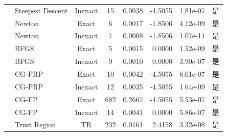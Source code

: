 \documentclass[a4paper,12pt]{article}
\begin{document}
{\begin{longtable}{llccrrrc}
    & Steepest Descent & Inexact & 15 & 0.0038 & -4.5055 & 1.81e-07 & 是 \\
    & Newton & Exact & 6 & 0.0017 & -1.8506 & 4.12e-09 & 是 \\
    & Newton & Inexact & 7 & 0.0008 & -1.8506 & 1.07e-11 & 是 \\
    & BFGS & Exact & 5 & 0.0015 & 0.0000 & 1.52e-09 & 是 \\
    & BFGS & Inexact & 9 & 0.0010 & 0.0000 & 3.90e-07 & 是 \\
    & CG-PRP & Exact & 10 & 0.0042 & -4.5055 & 8.61e-07 & 是 \\
    & CG-PRP & Inexact & 12 & 0.0035 & -4.5055 & 1.64e-09 & 是 \\
    & CG-FP & Exact & 682 & 0.2667 & -4.5055 & 5.53e-07 & 是 \\
    & CG-FP & Inexact & 14 & 0.0041 & 0.0000 & 5.86e-07 & 是 \\
    & Trust Region & TR & 232 & 0.0161 & 2.4158 & 3.32e-08 & 是 \\
    \bottomrule
    \end{longtable}
}
\end{document}
